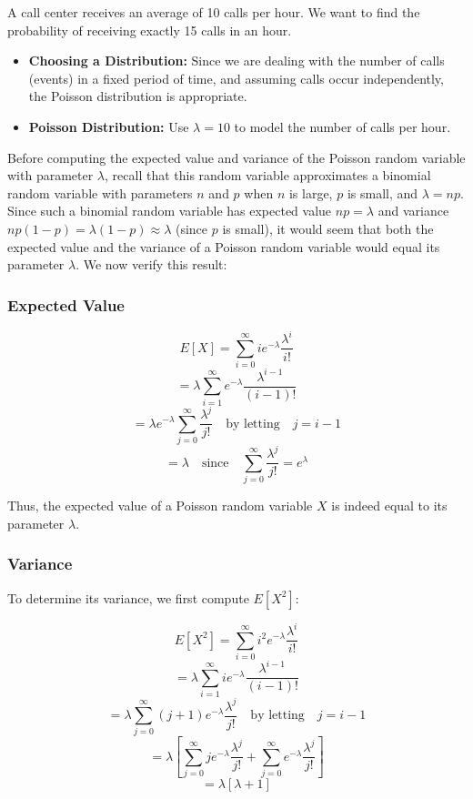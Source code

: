 \begin{example}
    A call center receives an average of 10 calls per hour. We want to find the probability of receiving exactly 15 calls in an hour.
\begin{itemize}
    \item \textbf{Choosing a Distribution:} Since we are dealing with the number of calls (events) in a fixed period of time, and assuming calls occur independently, the Poisson distribution is appropriate.
    \item \textbf{Poisson Distribution:} Use \(\lambda = 10\) to model the number of calls per hour.
\end{itemize}
\end{example}

Before computing the expected value and variance of the Poisson random variable with parameter \(\lambda\), recall that this random variable approximates a binomial random variable with parameters \(n\) and \(p\) when \(n\) is large, \(p\) is small, and \(\lambda = np\). Since such a binomial random variable has expected value \(np = \lambda\) and variance \(np(1 - p) = \lambda(1 - p) \approx \lambda\) (since \(p\) is small), it would seem that both the expected value and the variance of a Poisson random variable would equal its parameter \(\lambda\). We now verify this result:

\subsubsection*{Expected Value}
\[
E[X] = \sum_{i=0}^{\infty} i e^{-\lambda} \frac{\lambda^i}{i!}
\]
\[
= \lambda \sum_{i=1}^{\infty} e^{-\lambda} \frac{\lambda^{i-1}}{(i-1)!}
\]
\[
= \lambda e^{-\lambda} \sum_{j=0}^{\infty} \frac{\lambda^j}{j!} \quad \text{by letting} \quad j = i - 1
\]
\[
= \lambda \quad \text{since} \quad \sum_{j=0}^{\infty} \frac{\lambda^j}{j!} = e^\lambda
\]

Thus, the expected value of a Poisson random variable \(X\) is indeed equal to its parameter \(\lambda\).

\subsubsection*{Variance}
To determine its variance, we first compute \(E[X^2]\):

\[
E[X^2] = \sum_{i=0}^{\infty} i^2 e^{-\lambda} \frac{\lambda^i}{i!}
\]
\[
= \lambda \sum_{i=1}^{\infty} i e^{-\lambda} \frac{\lambda^{i-1}}{(i-1)!}
\]
\[
= \lambda \sum_{j=0}^{\infty} (j + 1) e^{-\lambda} \frac{\lambda^j}{j!} \quad \text{by letting} \quad j = i - 1
\]
\[
= \lambda \left[ \sum_{j=0}^{\infty} j e^{-\lambda} \frac{\lambda^j}{j!} + \sum_{j=0}^{\infty} e^{-\lambda} \frac{\lambda^j}{j!} \right]
\]
\[
= \lambda \left[ \lambda + 1 \right]
\]


